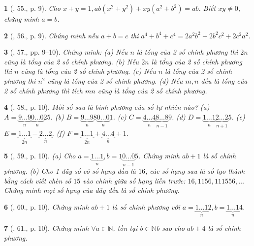 \documentclass{article}
\newtheorem{baitoan}{}
\begin{document}
\begin{baitoan}[\cite{Binh_Toan_8_tap_1}, 55., p. 9]
	Cho $x + y = 1,ab(x^2 + y^2) + xy(a^2 + b^2) = ab$. Biết $xy\ne0$, chứng minh $a = b$.
\end{baitoan}

\begin{baitoan}[\cite{Binh_Toan_8_tap_1}, 56., p. 9]
	Chứng minh nếu $a + b = c$ thì $a^4 + b^4 + c^4 = 2a^2b^2 + 2b^2c^2 + 2c^2a^2$.
\end{baitoan}

\begin{baitoan}[\cite{Binh_Toan_8_tap_1}, 57., pp. 9--10]
	Chứng minh: (a) Nếu $n$ là tổng của 2 số chính phương thì $2n$ cũng là tổng của 2 số chính phương. (b) Nếu $2n$ là tổng của 2 số chính phương thì $n$ cũng là tổng của 2 số chính phương. (c) Nếu $n$ là tổng của 2 số chính phương thì $n^2$ cũng là tổng của 2 số chính phương. (d) Nếu $m,n$ đều là tổng của 2 số chính phương thì tích $mn$ cũng là tổng của 2 số chính phương.
\end{baitoan}

\begin{baitoan}[\cite{Binh_Toan_8_tap_1}, 58., p. 10]
	Mỗi số sau là bình phương của số tự nhiên nào? (a) $A = \underbrace{9\ldots9}_n\underbrace{0\ldots0}_n25$. (b) $B = \underbrace{9\ldots9}_n8\underbrace{0\ldots0}_n1$. (c) $C = \underbrace{4\ldots4}_n\underbrace{8\ldots8}_{n-1}9$. (d) $D = \underbrace{1\ldots1}_n\underbrace{2\ldots2}_{n+1}5$. (e) $E = \underbrace{1\ldots1}_{2n} - \underbrace{2\ldots2}_n$. (f) $F = \underbrace{1\ldots1}_{2n} + \underbrace{4\ldots4}_n + 1$.
\end{baitoan}

\begin{baitoan}[\cite{Binh_Toan_8_tap_1}, 59., p. 10]
	(a) Cho $a = \underbrace{1\ldots1}_n,b = 1\underbrace{0\ldots0}_{n-1}5$. Chứng minh $ab + 1$ là số chính phương. (b) Cho 1 dãy số có số hạng đầu là $16$, các số hạng sau là số tạo thành bằng cách viết chèn số $15$ vào chính giữa số hạng liền trước: $16,1156,111556,\ldots$ Chứng minh mọi số hạng của dãy đều là số chính phương.
\end{baitoan}

\begin{baitoan}[\cite{Binh_Toan_8_tap_1}, 60., p. 10]
	Chứng minh $ab + 1$ là số chính phương với $a = \underbrace{1\ldots1}_n2,b = \underbrace{1\ldots1}_n4$.
\end{baitoan}

\begin{baitoan}[\cite{Binh_Toan_8_tap_1}, 61., p. 10]
	Chứng minh $\forall a\in\mathbb{N}$, tồn tại $b\in\mathbb{N}$b sao cho $ab + 4$ là số chính phương.
\end{baitoan}
\end{document}
